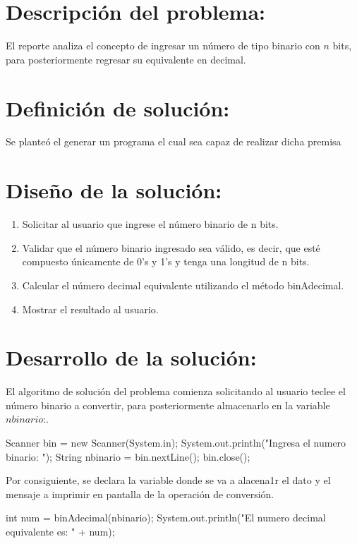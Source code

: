 \documentclass{IEEEcsmag}
\begin{document}
\section*{Descripción del problema:}
El reporte analiza el concepto de ingresar un número de tipo binario con $n$ bits, para posteriormente regresar su equivalente en decimal.

\section*{Definición de solución:}
Se planteó el generar un programa el cual sea capaz de realizar dicha premisa

\section*{Diseño de la solución:}
\begin{enumerate}
    \item Solicitar al usuario que ingrese el número binario de n bits.
    \item Validar que el número binario ingresado sea válido, es decir, que esté compuesto únicamente de 0's y 1's y tenga una longitud de n bits.
    \item Calcular el número decimal equivalente utilizando el método binAdecimal.
    \item Mostrar el resultado al usuario.
\end{enumerate}

\section*{Desarrollo de la solución:}
El algoritmo de solución del problema comienza solicitando al usuario teclee el número binario a convertir, para posteriormente almacenarlo en la variable $nbinario$:.
\begin{javaCode}
Scanner bin = new Scanner(System.in);
    System.out.println("Ingresa el numero binario: ");
    String nbinario = bin.nextLine();
    bin.close();
\end{javaCode}

Por consiguiente, se declara la variable donde se va a alacena1r el dato y el mensaje a imprimir en pantalla de la operación de conversión.

\begin{javaCode}
int num = binAdecimal(nbinario);
System.out.println("El numero decimal equivalente es: " + num);

\end{javaCode}
\end{document}
